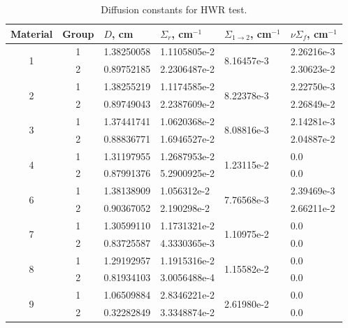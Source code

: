 \documentclass[authoryear]{elsarticle}
\begin{document}
\begin{table}[h]
\caption{Diffusion constants for HWR test.}
\label{tab:hwr}
\begin{center}
\begin{tabular}{ccllll}
\hline
Material & Group & $D$, cm & $\Sigma_r$, cm$^{-1}$ & $\Sigma_{1\to 2}$, cm$^{-1}$ & $\nu\Sigma_f$, cm$^{-1}$\\
\hline
\multirow{ 2}{*}{1} & 1 & 1.38250058 & 1.1105805e-2 & \multirow{ 2}{*}{8.16457e-3} & 2.26216e-3 \\
  & 2 & 0.89752185 & 2.2306487e-2 &            & 2.30623e-2 \\
\hline
\multirow{ 2}{*}{2} & 1 & 1.38255219 & 1.1174585e-2 & \multirow{ 2}{*}{8.22378e-3} & 2.22750e-3 \\
  & 2 & 0.89749043 & 2.2387609e-2 &            & 2.26849e-2 \\
\hline
\multirow{ 2}{*}{3} & 1 & 1.37441741 & 1.0620368e-2 & \multirow{ 2}{*}{8.08816e-3} & 2.14281e-3 \\
  & 2 & 0.88836771 & 1.6946527e-2 &            & 2.04887e-2 \\
\hline
\multirow{ 2}{*}{4} & 1 & 1.31197955 & 1.2687953e-2 & \multirow{ 2}{*}{1.23115e-2} & 0.0 \\
  & 2 & 0.87991376 & 5.2900925e-2 &            & 0.0 \\
\hline
\multirow{ 2}{*}{6} & 1 & 1.38138909 & 1.056312e-2 & \multirow{ 2}{*}{7.76568e-3} & 2.39469e-3 \\
  & 2 & 0.90367052 & 2.190298e-2 &            & 2.66211e-2 \\
\hline
\multirow{ 2}{*}{7} & 1 & 1.30599110 & 1.1731321e-2 & \multirow{ 2}{*}{1.10975e-2} & 0.0 \\
  & 2 & 0.83725587 & 4.3330365e-3 &            & 0.0 \\
\hline
\multirow{ 2}{*}{8} & 1 & 1.29192957 & 1.1915316e-2 & \multirow{ 2}{*}{1.15582e-2} & 0.0 \\
  & 2 & 0.81934103 & 3.0056488e-4 &            & 0.0 \\
\hline
\multirow{ 2}{*}{9} & 1 & 1.06509884 & 2.8346221e-2 & \multirow{ 2}{*}{2.61980e-2} & 0.0 \\
  & 2 & 0.32282849 & 3.3348874e-2 &            & 0.0 \\  
\hline
\end{tabular}
\end{center}
\end{table}
\end{document}
